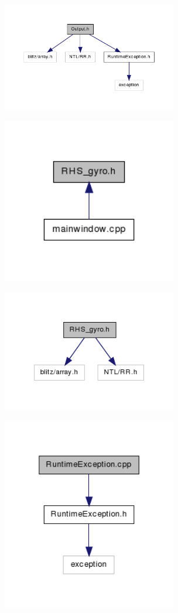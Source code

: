 \includegraphics[width=3in]{figures/_output_8h__incl.png}

\includegraphics[width=3in]{figures/_r_h_s__gyro_8h__dep__incl.png}

\includegraphics[width=3in]{figures/_r_h_s__gyro_8h__incl.png}

\includegraphics[width=3in]{figures/_runtime_exception_8cpp__incl.png}


